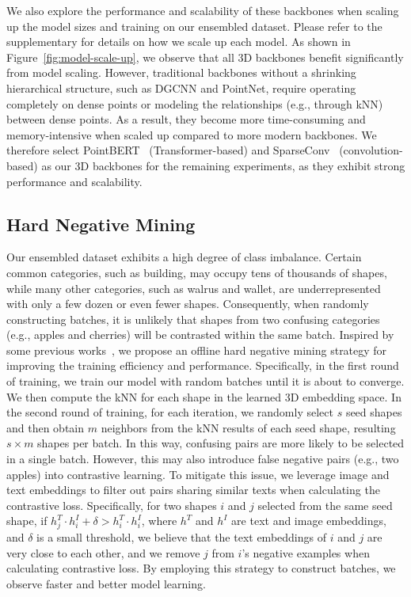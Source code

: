We also explore the performance and scalability of these backbones when scaling up the model sizes and training on our ensembled dataset. Please refer to the supplementary for details on how we scale up each model. As shown in Figure~\ref{fig:model-scale-up}, we observe that all 3D backbones benefit significantly from model scaling. However, traditional backbones without a shrinking hierarchical structure, such as DGCNN and PointNet, require operating completely on dense points or modeling the relationships (e.g., through kNN) between dense points. As a result, they become more time-consuming and memory-intensive when scaled up compared to more modern backbones. We therefore select PointBERT~\cite{yu2021pointbert} (Transformer-based) and SparseConv~\cite{choy20194d} (convolution-based) as our 3D backbones for the remaining experiments, as they exhibit strong performance and scalability.

\vspace{-0.5em}
\subsection{Hard Negative Mining}
\label{sec:hard-negative-mining}
\vspace{-0.5em}

Our ensembled dataset exhibits a high degree of class imbalance. Certain common categories, such as building, may occupy tens of thousands of shapes, while many other categories, such as walrus and wallet, are underrepresented with only a few dozen or even fewer shapes. Consequently, when randomly constructing batches, it is unlikely that shapes from two confusing categories (e.g., apples and cherries) will be contrasted within the same batch. Inspired by some previous works~\cite{robinson2020contrastive,kalantidis2020hard}, we propose an offline hard negative mining strategy for improving the training efficiency and performance. Specifically, in the first round of training, we train our model with random batches until it is about to converge. We then compute the kNN for each shape in the learned 3D embedding space. In the second round of training, for each iteration, we randomly select $s$ seed shapes and then obtain $m$ neighbors from the kNN results of each seed shape, resulting $s\times m$ shapes per batch. In this way, confusing pairs are more likely to be selected in a single batch. However, this may also introduce false negative pairs (e.g., two apples) into contrastive learning. To mitigate this issue, we leverage image and text embeddings to filter out pairs sharing similar texts when calculating the contrastive loss. Specifically, for two shapes $i$ and $j$ selected from the same seed shape, if $h_j^T\cdot h_i^I  + \delta > h_i^T\cdot h_i^I$, where $h^T$ and $h^I$ are text and image embeddings, and $\delta$ is a small threshold, we believe that the text embeddings of $i$ and $j$ are very close to each other, and we remove $j$ from $i$'s negative examples when calculating contrastive loss. By employing this strategy to construct batches, we observe faster and better model learning.
